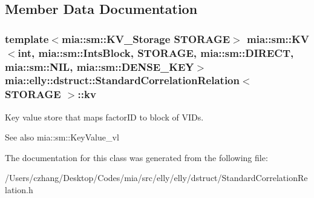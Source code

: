 \subsection{Member Data Documentation}
\hypertarget{classmia_1_1elly_1_1dstruct_1_1_standard_correlation_relation_ac3c97abf0391b1bd326ca769e2f6b992}{
\subsubsection[{kv}]{\setlength{\rightskip}{0pt plus 5cm}template$<$mia\-::sm\-::\-K\-V\-\_\-\-Storage S\-T\-O\-R\-A\-G\-E$>$ {\bf mia\-::sm\-::\-K\-V}$<$int, {\bf mia\-::sm\-::\-Ints\-Block}, S\-T\-O\-R\-A\-G\-E, mia\-::sm\-::\-D\-I\-R\-E\-C\-T, mia\-::sm\-::\-N\-I\-L, mia\-::sm\-::\-D\-E\-N\-S\-E\-\_\-\-K\-E\-Y$>$ {\bf mia\-::elly\-::dstruct\-::\-Standard\-Correlation\-Relation}$<$ S\-T\-O\-R\-A\-G\-E $>$\-::kv}}\label{classmia_1_1elly_1_1dstruct_1_1_standard_correlation_relation_ac3c97abf0391b1bd326ca769e2f6b992}
Key value store that maps factor\-I\-D to block of V\-I\-Ds.

\begin{DoxySeeAlso}{See also}
mia\-::sm\-::\-Key\-Value\-\_\-vl 
\end{DoxySeeAlso}


The documentation for this class was generated from the following file\-:\begin{DoxyCompactItemize}
\item 
/\-Users/czhang/\-Desktop/\-Codes/mia/src/elly/elly/dstruct/Standard\-Correlation\-Relation.\-h\end{DoxyCompactItemize}
